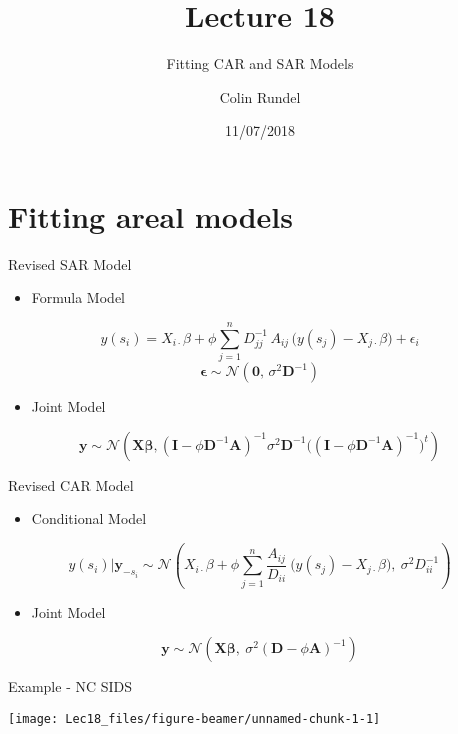 \documentclass[11pt,ignorenonframetext,]{beamer}
\title{Lecture 18}
\subtitle{Fitting CAR and SAR Models}
\author{Colin Rundel}
\date{11/07/2018}
\providecommand{\tightlist}{%
  \setlength{\itemsep}{0pt}\setlength{\parskip}{0pt}}
\begin{document}
\frame{\titlepage}

\hypertarget{fitting-areal-models}{%
\section{Fitting areal models}\label{fitting-areal-models}}

\begin{frame}[t]{Revised SAR Model}
\protect\hypertarget{revised-sar-model}{}

\begin{itemize}
\tightlist
\item
  Formula Model
\end{itemize}

\[ y(s_i) = X_{i\cdot}\beta + \phi \sum_{j=1}^n D^{-1}_{jj} \, A_{ij} \, \big(y(s_j) - X_{j\cdot}\beta\big) + \epsilon_i \]
\[ \symbf{\epsilon} \sim \mathcal{N}(\symbf{0},\, \sigma^2 \symbf{D}^{-1}) \]

\begin{itemize}
\tightlist
\item
  Joint Model
\end{itemize}

\[
\symbf{y} \sim \mathcal{N}\left(\symbf{X}\symbf{\beta}, (\symbf{I} - \phi \symbf{D}^{-1} \symbf{A})^{-1} \sigma^2 \symbf{D}^{-1} \big((\symbf{I} - \phi \symbf{D}^{-1} \symbf{A})^{-1}\big)^t \right)
\]

\end{frame}

\begin{frame}[t]{Revised CAR Model}
\protect\hypertarget{revised-car-model}{}

\begin{itemize}
\tightlist
\item
  Conditional Model
\end{itemize}

\[ y(s_i)|\symbf{y}_{-s_i} \sim \mathcal{N}\left(X_{i\cdot}\beta + \phi\sum_{j=1}^n \frac{A_{ij}}{D_{ii}} ~ \big(y(s_j)-X_{j\cdot}\beta\big),~ \sigma^2 D^{-1}_{ii} \right) \]

\begin{itemize}
\tightlist
\item
  Joint Model
\end{itemize}

\[\symbf{y} \sim \mathcal{N}(\symbf{X}\symbf{\beta},~\sigma^2(\symbf{D}-\phi \symbf{A})^{-1})\]

\end{frame}

\begin{frame}{Example - NC SIDS}
\protect\hypertarget{example---nc-sids}{}

\begin{center}\texttt{[image: Lec18\_files/figure-beamer/unnamed-chunk-1-1]} \end{center}

\end{frame}
\end{document}
